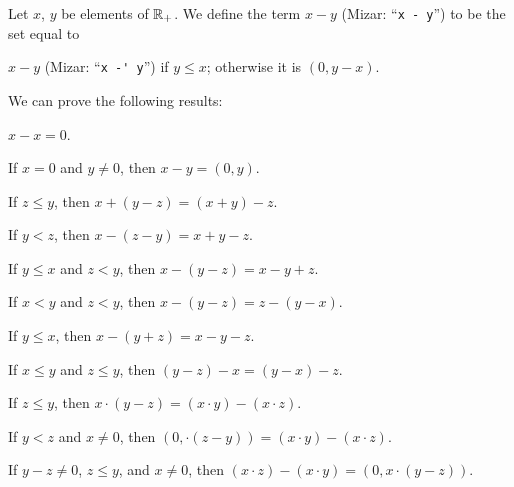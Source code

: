 \documentclass{article}
\begin{document}
\begin{definition}
Let $x$, $y$ be elements of $\mathbb{R}_{+}$.
We define the term $x-y$ (Mizar: ``\verb#x - y#'') to be the set equal
to
\begin{defn}
\item $x - y$ (Mizar: ``\verb#x -' y#'') if $y\leq x$; otherwise it is $(0,y-x)$.
\end{defn}
\end{definition}

We can prove the following results:
\begin{thm}
\item\label{arytm1:18} $x-x=0$.
\item\label{arytm1:19} If $x=0$ and $y\neq0$, then $x-y=(0,y)$.
\item\label{arytm1:20} If $z\leq y$, then $x+(y-z)=(x+y)-z$.
\item\label{arytm1:21} If $y<z$, then $x-(z-y)=x+y-z$.
\item\label{arytm1:22} If $y\leq x$ and $z<y$, then $x-(y-z)=x-y+z$.
\item\label{arytm1:23} If $x<y$ and $z<y$, then $x-(y-z)=z-(y-x)$.
\item\label{arytm1:24} If $y\leq x$, then $x-(y+z)=x-y-z$.
\item\label{arytm1:25} If $x\leq y$ and $z\leq y$, then $(y-z)-x=(y-x)-z$.
\item\label{arytm1:26} If $z\leq y$, then $x\cdot(y-z)=(x\cdot y)-(x\cdot z)$.
\item\label{arytm1:27} If $y<z$ and $x\neq0$, then $(0,\cdot(z-y))=(x\cdot y)-(x\cdot z)$.
\item\label{arytm1:28} If $y-z\neq0$, $z\leq y$, and $x\neq0$,
  then $(x\cdot z)-(x\cdot y)=(0,x\cdot(y-z))$.
\end{thm}
\end{document}
